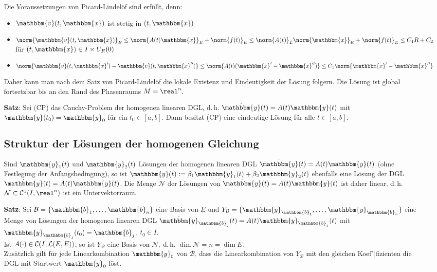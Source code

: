 Die Voraussetzungen von Picard-Lindelöf sind erfüllt, denn:
\begin{itemize}
    \item
    $\mathbbm{v}(t, \mathbbm{x})$ ist stetig in $(t, \mathbbm{x})$
    
    \item
    $\norm{\mathbbm{v}(t, \mathbbm{x})}_E \le
    \norm{A(t) \mathbbm{x}}_E + \norm{f(t)}_E \le
    \norm{A(t)}_\L \norm{\mathbbm{x}}_E + \norm{f(t)}_E \le
    C_1 R + C_2$ \\
    für $(t, \mathbbm{x}) \in I \times U_R(0)$
    
    \item
    $\norm{\mathbbm{v}(t, \mathbbm{x}') - \mathbbm{v}(t, \mathbbm{x}'')} \le
    \norm{A(t) (\mathbbm{x}' - \mathbbm{x}'')} \le
    C_1 \norm{\mathbbm{x}' - \mathbbm{x}''}$
\end{itemize}
Daher kann man nach dem Satz von Picard-Lindelöf die lokale Existenz und
Eindeutigkeit der Lösung folgern.
Die Lösung ist global fortsetzbar bis an den Rand des Phasenraums
$M = \real^n$.

\textbf{Satz}:
Sei (CP) das Cauchy-Problem der homogenen linearen DGL, d.\,h.
$\dot{\mathbbm{y}}(t) = A(t) \mathbbm{y}(t)$ mit
$\mathbbm{y}(t_0) = \mathbbm{y}_0$ für ein $t_0 \in [a, b]$.
Dann besitzt (CP) eine eindeutige Lösung für alle $t \in [a, b]$.

\pagebreak

\subsection{%
    Struktur der Lösungen der homogenen Gleichung%
}

Sind $\mathbbm{y}_1(t)$ und $\mathbbm{y}_2(t)$ Lösungen der homogenen
linearen DGL $\dot{\mathbbm{y}}(t) = A(t) \mathbbm{y}(t)$
(ohne Festlegung der Anfangsbedingung), so ist
$\mathbbm{y}(t) := \beta_1 \mathbbm{y}_1(t) + \beta_2 \mathbbm{y}_2(t)$
ebenfalls eine Lösung der DGL $\dot{\mathbbm{y}}(t) = A(t) \mathbbm{y}(t)$.
Die Menge $\mathcal{N}$ der Lösungen von
$\dot{\mathbbm{y}}(t) = A(t) \mathbbm{y}(t)$ ist daher linear, d.\,h.
$\mathcal{N} \subset \C^1(I, \real^n)$ ist ein Untervektorraum.

\textbf{Satz}:
Sei $\mathcal{B} = \{\mathbbm{b}_1, \dotsc, \mathbbm{b}_n\}$ eine Basis von $E$
und $Y_\mathcal{B} = \{\mathbbm{y}_{\mathbbm{b}_1}, \dotsc,
\mathbbm{y}_{\mathbbm{b}_n}\}$ eine Menge von Lösungen der
homogenen linearen DGL
$\dot{\mathbbm{y}}_{\mathbbm{b}_j}(t) = A(t) \mathbbm{y}_{\mathbbm{b}_j}(t)$
mit $\mathbbm{y}_{\mathbbm{b}_j}(t_0) = \mathbbm{b}_j$, $t_0 \in I$. \\
Ist $A(\cdot) \in \mathcal{C}(I, \mathcal{L}(E, E))$, so ist
$Y_\mathcal{B}$ eine Basis von $\mathcal{N}$, d.\,h.
$\dim \mathcal{N} = n = \dim E$. \\
Zusätzlich gilt für jede Linearkombination $\mathbbm{y}_0$
von $\mathcal{B}$, dass die
Linearkombination von $Y_\mathcal{B}$ mit den gleichen Koef"|fizienten die DGL
mit Startwert $\mathbbm{y}_0$ löst.

